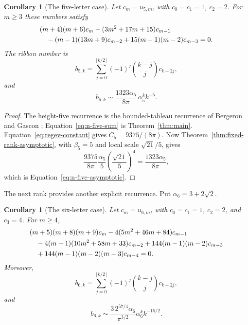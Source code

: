 \documentclass[11pt]{article}
\newtheorem{corollary}[theorem]{Corollary}
\theoremstyle{definition}
\begin{document}
\begin{corollary}[The five-letter case]\label{cor:n-five}
Let $c_m=u_{5,m}$, with $c_0=c_1=1$, $c_2=2$.  For $m\ge3$ these numbers
satisfy
\begin{align}\label{eq:height-five-recurrence}
 &(m+4)(m+6)c_m-(3m^2+17m+15)c_{m-1}\\
 &\quad{}-(m-1)(13m+9)c_{m-2}
 +15(m-1)(m-2)c_{m-3}=0.\notag
\end{align}
The ribbon number is
\begin{equation}\label{eq:n-five-sum}
 b_{5,k}=\sum_{j=0}^{\lfloor k/2\rfloor}
 (-1)^j\binom{k-j}{j}c_{k-2j},
\end{equation}
and
\begin{equation}\label{eq:n-five-asymptotic}
 b_{5,k}\sim
 \frac{1323\alpha_5}{8\pi}\,
 \alpha_5^k k^{-5}.
\end{equation}
\end{corollary}

\begin{proof}
The height-five recurrence is the bounded-tableau recurrence of
Bergeron and Gascon \cite{BergeronGascon2000};
Equation~\eqref{eq:n-five-sum} is Theorem~\ref{thm:main}.
Equation~\eqref{eq:regev-constant} gives $C_5=9375/(8\pi)$.  Now
Theorem~\ref{thm:fixed-rank-asymptotic}, with $\beta_5=5$ and local scale
$\sqrt{21}/5$, gives
\[
 \frac{9375}{8\pi}\frac{\alpha_5}{5}
 \left(\frac{\sqrt{21}}5\right)^4
 =\frac{1323\alpha_5}{8\pi},
\]
which is Equation~\eqref{eq:n-five-asymptotic}.
\end{proof}

The next rank provides another explicit recurrence.  Put
$\alpha_6=3+2\sqrt2$.

\begin{corollary}[The six-letter case]\label{cor:n-six}
Let $c_m=u_{6,m}$, with $c_0=c_1=1$, $c_2=2$, and $c_3=4$.  For $m\ge4$,
\begin{align}\label{eq:height-six-recurrence}
 &(m+5)(m+8)(m+9)c_m
 -4(5m^2+46m+84)c_{m-1}\notag\\
 &\quad{}-4(m-1)(10m^2+58m+33)c_{m-2}
 +144(m-1)(m-2)c_{m-3}\notag\\
 &\quad{}+144(m-1)(m-2)(m-3)c_{m-4}=0.
\end{align}
Moreover,
\begin{equation}\label{eq:n-six-sum}
 b_{6,k}=\sum_{j=0}^{\lfloor k/2\rfloor}
 (-1)^j\binom{k-j}{j}c_{k-2j},
\end{equation}
and
\begin{equation}\label{eq:n-six-asymptotic}
 b_{6,k}\sim
 \frac{3\,2^{57/4}\alpha_6}{\pi^{3/2}}
 \alpha_6^k k^{-15/2}.
\end{equation}
\end{corollary}
\end{document}

